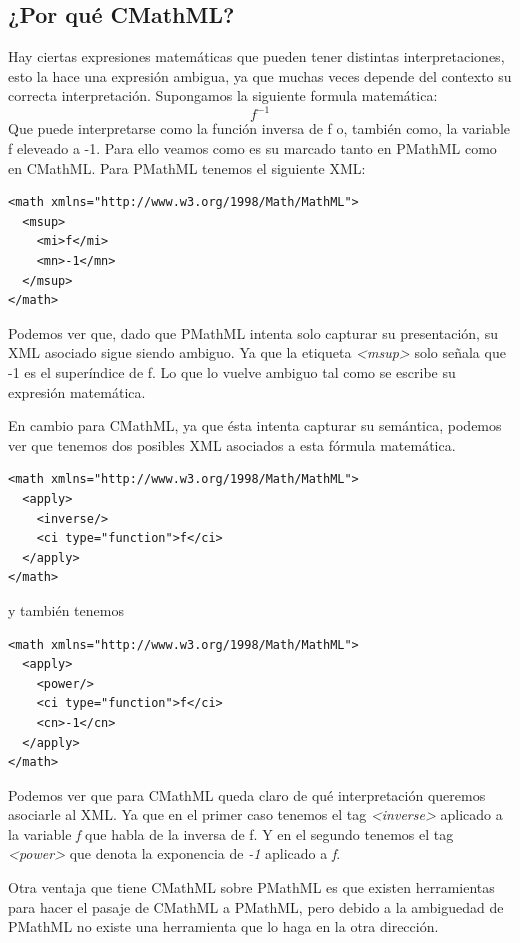 \subsection{¿Por qué CMathML?}
Hay ciertas expresiones matemáticas que pueden tener distintas interpretaciones, esto la hace una expresión ambigua, ya que muchas veces
depende del contexto su correcta interpretación. Supongamos la siguiente formula matemática:
$$f^{-1}$$
Que puede interpretarse como la función inversa de f o, también como, la variable f eleveado a -1. Para ello veamos como es su marcado tanto en PMathML como en CMathML.
Para PMathML tenemos el siguiente XML:
\lstset{language=XML}
\begin{lstlisting}
<math xmlns="http://www.w3.org/1998/Math/MathML">
  <msup>
    <mi>f</mi>
    <mn>-1</mn>
  </msup>
</math>
\end{lstlisting}

Podemos ver que, dado que PMathML intenta solo capturar su presentación, su XML asociado sigue siendo ambiguo. Ya que la etiqueta \textit{<msup>} solo 
señala que -1 es el superíndice de f. Lo que lo vuelve ambiguo tal como se escribe su expresión matemática.

En cambio para CMathML, ya que ésta intenta capturar su semántica, podemos ver que tenemos dos posibles XML asociados a esta fórmula matemática.

\lstset{language=XML}
\begin{lstlisting}
<math xmlns="http://www.w3.org/1998/Math/MathML">
  <apply>
    <inverse/>
    <ci type="function">f</ci>
  </apply>
</math>
\end{lstlisting}

y también tenemos

\lstset{language=XML}
\begin{lstlisting}
<math xmlns="http://www.w3.org/1998/Math/MathML">
  <apply>
    <power/>
    <ci type="function">f</ci>
    <cn>-1</cn>
  </apply>
</math>
\end{lstlisting}

Podemos ver que para CMathML queda claro de qué interpretación queremos asociarle al XML. Ya que en el primer caso tenemos el tag \textit{<inverse>}
aplicado a la variable \textit{f} que habla de la inversa de f. Y en el segundo tenemos el tag \textit{<power>} que denota la exponencia de \textit{-1} aplicado a \textit{f}.

Otra ventaja que tiene CMathML sobre PMathML es que existen herramientas para hacer el pasaje de CMathML a PMathML, pero debido a la ambiguedad de PMathML no existe una herramienta que lo haga en la otra dirección.

